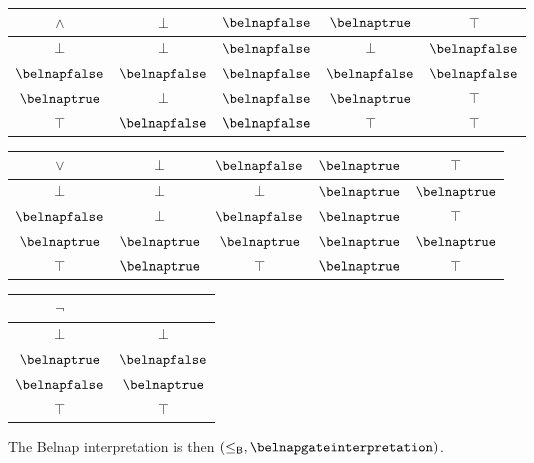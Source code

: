 \begin{example}
    \begin{center}
        \begin{tabular}{|c|cccc|}
            \hline
            \(\land\)        & \(\bot\)         & \(\belnapfalse\) & \(\belnaptrue\)  & \(\top\)         \\
            \hline
            \(\bot\)         & \(\bot\)         & \(\belnapfalse\) & \(\bot\)         & \(\belnapfalse\) \\
            \(\belnapfalse\) & \(\belnapfalse\) & \(\belnapfalse\) & \(\belnapfalse\) & \(\belnapfalse\) \\
            \(\belnaptrue\)  & \(\bot\)         & \(\belnapfalse\) & \(\belnaptrue\)  & \(\top\)         \\
            \(\top\)         & \(\belnapfalse\) & \(\belnapfalse\) & \(\top\)         & \(\top\)         \\
            \hline
        \end{tabular}
        \quad
        \begin{tabular}{|c|cccc|}
            \hline
            \(\lor\)         & \(\bot\)        & \(\belnapfalse\) & \(\belnaptrue\) & \(\top\)        \\
            \hline
            \(\bot\)         & \(\bot\)        & \(\bot\)         & \(\belnaptrue\) & \(\belnaptrue\) \\
            \(\belnapfalse\) & \(\bot\)        & \(\belnapfalse\) & \(\belnaptrue\) & \(\top\)        \\
            \(\belnaptrue\)  & \(\belnaptrue\) & \(\belnaptrue\)  & \(\belnaptrue\) & \(\belnaptrue\) \\
            \(\top\)         & \(\belnaptrue\) & \(\top\)         & \(\belnaptrue\) & \(\top\)        \\
            \hline
        \end{tabular}
        \quad
        \begin{tabular}{|c|c|}
            \hline
            \(\neg\)         &                  \\
            \hline
            \(\bot\)         & \(\bot\)         \\
            \(\belnaptrue\)  & \(\belnapfalse\) \\
            \(\belnapfalse\) & \(\belnaptrue\)  \\
            \(\top\)         & \(\top\)         \\
            \hline
        \end{tabular}
    \end{center}

    The Belnap interpretation is then \(
    (\leq_\mathsf{B}, \belnapgateinterpretation)
    \).
\end{example}
